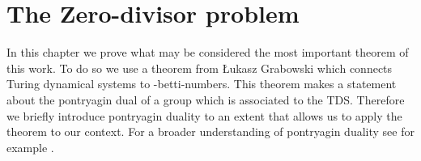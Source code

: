 \section{The Zero-divisor problem}

In this chapter we prove what may be considered the most important theorem of this work.
To do so we use a theorem from \L{}ukasz Grabowski which connects Turing dynamical systems to \ltwo-betti-numbers.
This theorem makes a statement about the pontryagin dual of a group which is associated to the TDS.
Therefore we briefly introduce pontryagin duality to an extent that allows us to apply the theorem to our context.
For a broader understanding of pontryagin duality see for example \cite{fol95}.




